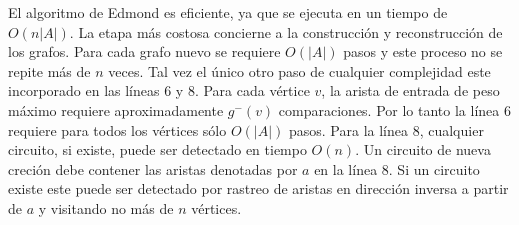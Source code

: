 \documentclass[10pt,a5paper]{book}
\begin{document}
El algoritmo de Edmond es eficiente, ya que se ejecuta en un tiempo de $O(n|A|)$. La etapa más costosa concierne a la construcción y reconstrucción de los grafos. Para cada grafo nuevo se requiere $O(|A|)$ pasos y este proceso no se repite más de $n$ veces. Tal vez el único otro paso de cualquier complejidad este incorporado en las líneas 6 y 8. Para cada vértice $v$, la arista de entrada de peso máximo requiere aproximadamente $g^-(v)$ comparaciones. Por lo tanto la línea 6 requiere para todos los vértices sólo $O(|A|)$ pasos. Para la línea 8, cualquier circuito, si existe, puede ser detectado en tiempo $O(n)$. Un circuito de nueva creción debe contener las aristas denotadas por $a$ en la línea 8. Si un circuito existe este puede ser detectado por rastreo de aristas en dirección inversa a partir de $a$ y visitando no más de $n$ vértices.
\end{document}
